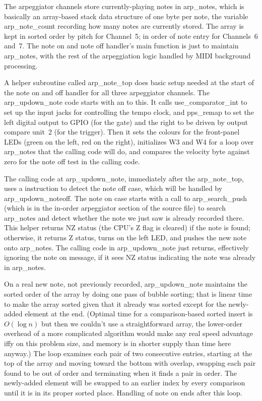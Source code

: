 The arpeggiator channels store currently-playing notes in arp\_notes, which
is basically an array-based stack data structure of one byte per note, the
variable arp\_note\_count recording how many notes are currently stored. 
The array is kept in sorted order by pitch for Channel~5; in order of note
entry for Channels~6 and~7.  The note on and note off handler's main
function is just to maintain arp\_notes, with the rest of the arpeggiation
logic handled by MIDI background processing.

A helper subroutine called arp\_note\_top does basic setup needed at the
start of the note on and off handler for all three arpeggiator channels. 
The arp\_updown\_note code starts with an  to this.  It calls
use\_comparator\_int to set up the input jacks for controlling the tempo
clock, and pps\_remap to set the left digital output to GPIO (for the gate)
and the right to be driven by output compare unit~2 (for the trigger).  Then
it sets the colours for the front-panel LEDs (green on the left, red on the
right), initializes W3 and W4 for a loop over arp\_notes that the calling
code will do, and compares the velocity byte against zero for the note off
test in the calling code.

The calling code at arp\_updown\_note, immediately
after the  arp\_note\_top, uses a  instruction to
detect the note off case, which will be handled by arp\_updown\_noteoff. 
The note on case starts with a call to arp\_search\_push (which is in the
in-order arpeggiator section of the source file) to search arp\_notes and
detect whether the note we just saw is already recorded there.  This helper
returns NZ status (the CPU's Z flag is cleared) if the note is found;
otherwise, it returns Z status, turns on the left LED, and pushes the new
note onto arp\_notes.  The calling code in arp\_updown\_note just returns,
effectively ignoring the note on message, if it sees NZ status indicating
the note was already in arp\_notes.

On a real new note, not previously recorded, arp\_updown\_note maintains the
sorted order of the array by doing one pass of bubble sorting; that is
linear time to make the array sorted given that it already was sorted except
for the newly-added element at the end.  (Optimal time for a
comparison-based sorted insert is $O(\log n)$ but then we couldn't use a
straightforward array, the lower-order overhead of a more complicated
algorithm would make any real speed advantage iffy on this problem size, and
memory is in shorter supply than time here anyway.) The loop examines each
pair of two consecutive entries, starting at the top of the array and moving
toward the bottom with overlap, swapping each pair found to be out of order
and terminating when it finds a pair in order.  The newly-added element will
be swapped to an earlier index by every comparison until it is in its proper
sorted place.  Handling of note on ends after this loop.

